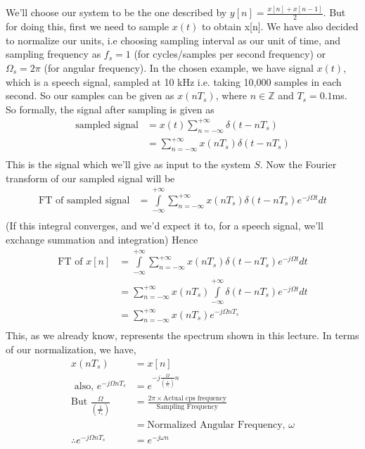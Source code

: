 We'll choose our system to be the one described by $y[n]=\frac{x[n]+x[n-1]}{2}$. But for doing this, first we need to sample $x(t)$ to obtain x[n]. We have also decided to normalize our units, i.e choosing sampling interval as our unit of time, and sampling frequency as $f_s=1$ (for cycles/samples per second frequency) or $\Omega_s=2\pi$ (for angular frequency). In the chosen example, we have signal $x(t)$, which is a speech signal, sampled at 10 kHz i.e. taking 10,000 samples in each second. So our samples can be given as $x(nT_s)$, where $n\in\mathbb{Z}$ and $T_s = 0.1$ms.\\
So formally, the signal after sampling is given as 
\begin{align*}
\text{sampled signal}&=x(t)\sum\limits_{n=-\infty}^{+\infty} \delta(t-nT_s)\\
&=\sum\limits_{n=-\infty}^{+\infty} x(nT_s)\delta(t-nT_s)\\
\end{align*}
This is the signal which we'll give as input to the system $S$. Now the Fourier transform of our sampled signal will be
\begin{align*}
\text{FT of sampled signal}&=\int\limits_{-\infty}^{+\infty}\sum\limits_{n=-\infty}^{+\infty} x(nT_s)\delta(t-nT_s)e^{-j\Omega t}dt\\
\end{align*}
(If this integral converges, and we'd expect it to, for a speech signal, we'll exchange summation and integration) Hence
\begin{align*}
\text{FT of }x[n]&=\int\limits_{-\infty}^{+\infty}\sum\limits_{n=-\infty}^{+\infty} x(nT_s)\delta(t-nT_s)e^{-j\Omega t}dt\\
&=\sum\limits_{n=-\infty}^{+\infty}x(nT_s)\int\limits_{-\infty}^{+\infty}\delta(t-nT_s)e^{-j\Omega t}dt\\
&=\sum\limits_{n=-\infty}^{+\infty}x(nT_s)e^{-j\Omega nT_s}\\
\end{align*}
This, as we already know, represents the spectrum shown in this lecture. In terms of our normalization, we have,
\begin{align*}
x(nT_s)&=x[n]\\
\text{ also, }e^{-j\Omega nT_s}&=e^{-j\frac{\Omega}{\left(\frac{1}{T_s}\right)}n}\\
\text{But }\frac{\Omega}{\left(\frac{1}{T_s}\right)}&=\frac{2\pi\times\text{Actual cps frequency}}{\text{Sampling Frequency}}\\
&=\text{Normalized Angular Frequency, }\omega\\
\therefore e^{-j\Omega nT_s}&=e^{-j\omega n}\\
\end{align*}
